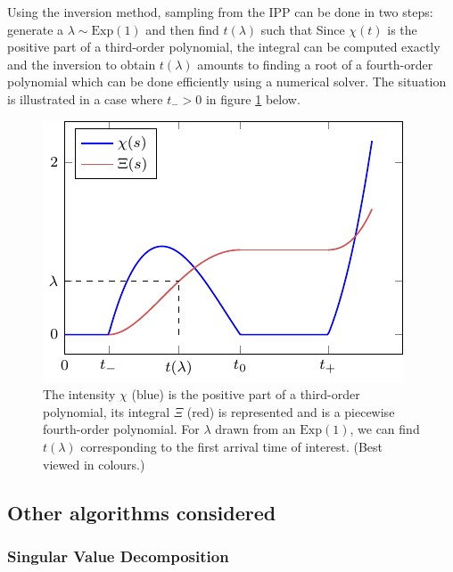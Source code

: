 Using the inversion method, sampling from the IPP can be done in two steps: generate a $\lambda\sim\mathrm{Exp}(1)$ and then find $t(\lambda)$ such that
Since $\chi(t)$ is the positive part of a third-order polynomial, the integral can be computed exactly and the inversion to obtain $t(\lambda)$ amounts to finding a root of a fourth-order polynomial which can be done efficiently using a numerical solver. 
The situation is illustrated in a case where $t_{-}>0$ in figure \ref{fig-lbps-plot} below.
%
\begin{figure}[!h]
\centering
	\includegraphics[width=.7\textwidth]{figures/lbp/pmf_plot}
	\caption{\label{fig-lbps-plot} The intensity $\chi$ (blue) is the positive part of a third-order polynomial, its integral $\Xi$ (red) is represented and is a piecewise fourth-order polynomial. For $\lambda$ drawn from an $\mathrm{Exp}(1)$, we can find $t(\lambda)$ corresponding to the first arrival time of interest. (Best viewed in colours.)}
\end{figure}
%



\subsection{Other algorithms considered}

\subsubsection{Singular Value Decomposition}

